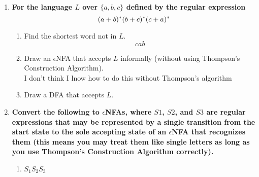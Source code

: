 

\begin{enumerate}

\item \textbf{For the language $L$ over $\{a,b,c\}$ defined by the regular expression} $$(a+b){}^\ast(b+c){}^\ast(c+a){}^\ast$$

\begin{enumerate}
    \item Find the shortest word not in $L$.
    $$cab$$
    \item Draw an $\epsilon$NFA that accepts $L$ informally (without using Thompson's Construction Algorithm).
\\  I don't think I lnow how to do this without Thompson's algorithm
    
    \item Draw a DFA that accepts $L$.


\end{enumerate}

\newpage

\item \textbf{Convert the following to $\epsilon$NFAs, where $S1$, $S2$, and
    $S3$ are regular expressions that may be represented by a single
    transition from the start state to the sole accepting state of an
    $\epsilon$NFA that recognizes them (this means you may treat them like
    single letters as long as you use Thompson's Construction Algorithm correctly).}

\begin{enumerate}
    \item $S_1 S_2 S_3$
\end{enumerate}
\end{enumerate}
